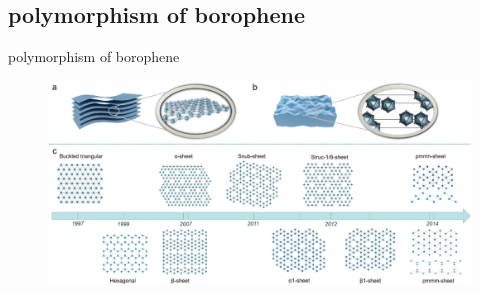 \documentclass[handout,t]{beamer}
\begin{document}
\subsection{polymorphism of borophene}
\begin{frame}{polymorphism of borophene}
	\begin{figure}
		\centering
		\includegraphics[width=\textwidth]{../figures/theory-borophene.png}
		\label{theoryborophene}
	\end{figure}
\end{frame}
\end{document}
